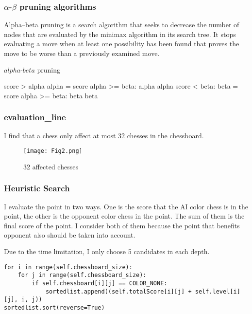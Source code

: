 \documentclass[10pt,twocolumn,letterpaper]{article}
\begin{document}
\subsubsection{$\alpha$-$\beta$ pruning algorithms}
Alpha–beta pruning is a search algorithm that seeks to decrease the number of nodes that are evaluated by the minimax algorithm in its search tree. It stops evaluating a move when at least one possibility has been found that proves the move to be worse than a previously examined move. 

\begin{algorithm}
  \caption{$alpha$-$beta$ pruning}
  \begin{algorithmic}[1]
        \If score > alpha
            \State alpha = score
        \EndIf
        \If alpha >= beta:
            \State \Return alpha
        \EndIf
        \State \Return alpha
    \Else
        \If score < beta:
            \State beta = score
        \EndIf
        \If alpha >= beta:
            \State \Return beta
        \EndIf
        \State \Return beta
    \EndIf
  \end{algorithmic}  
\end{algorithm} 

\subsubsection{evaluation\_line}
I find that a chess only affect at most 32 chesses in the chessboard.

\begin{figure}[H]
  \centering
  \texttt{[image: Fig2.png]}\\
  \caption{32 affected chesses
}\label{straddltimeScale}
\end{figure}

\subsubsection{Heuristic Search}
I evaluate the point in two ways. One is the score that the AI color chess is in the point, the other is the opponent color chess in the point. The sum of them is the final score of the point. I consider both of them because the point that benefits opponent also should be taken into account.

Due to the time limitation, I only choose 5 candidates in each depth.

\begin{lstlisting}
for i in range(self.chessboard_size):
    for j in range(self.chessboard_size):
        if self.chessboard[i][j] == COLOR_NONE:
            sortedlist.append((self.totalScore[i][j] + self.level[i][j], i, j))
sortedlist.sort(reverse=True)
\end{lstlisting}
\end{document}
